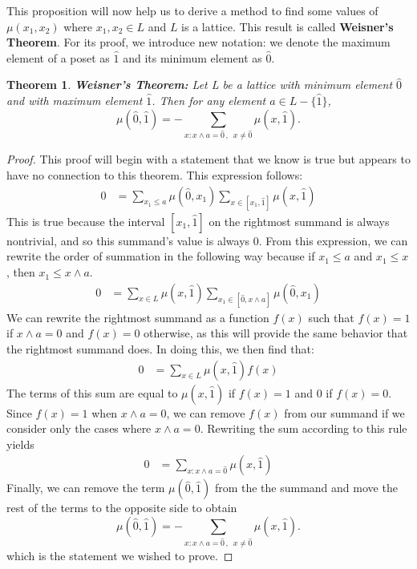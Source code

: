 \documentclass{article} %
\theoremstyle{definition}
\theoremstyle{plain}
\newtheorem{thm}{Theorem}[section]
\begin{document}
This proposition will now help us to derive a method to find some values of $\mu(x_{1}, x_{2})$ where $x_{1}, x_{2} \in L$ and $L$ is a lattice.  This result is called \textbf{Weisner's Theorem}. For its proof, we introduce new notation: we denote the maximum element of a poset as $\hat{1}$ and its minimum element as $\hat{0}$. \\

\begin{thm} \textbf{Weisner's Theorem:}
Let L be a lattice with minimum element $\hat{0}$ and with maximum element $\hat{1}$. Then for any element $a \in L-\{\hat{1}\}$,
\begin{equation*}
\mu(\hat{0}, \hat{1})=-\sum_{x:x \wedge a = \hat{0}\, , \,\,\, x \neq \hat{0}} \mu(x, \hat{1}). %
\end{equation*}
\end{thm}
\begin{proof}
This proof will begin with a statement that we know is true but appears to have no connection to this theorem. This expression follows:
\begin{align*}
0 &=  \sum_{x_{1} \leq a} \mu(\hat{0}, x_{1}) \sum_{x \in [x_{1}, \hat{1}]} \mu(x, \hat{1})
\end{align*}
This is true because the interval $[x_{1}, \hat{1}]$ on the rightmost summand is always nontrivial, and so this summand's value is always $0$. From this expression, we can rewrite the order of summation in the following way because if $x_{1} \leq a$ and $x_{1} \leq x$, then $x_{1} \leq x \wedge a$.
\begin{align*}
0 &= \sum_{x \in L} \mu(x, \hat{1}) \sum_{x_{1} \in [\hat{0}, x \wedge a]} \mu(\hat{0}, x_{1})
\end{align*}
We can rewrite the rightmost summand as a function $f(x)$ such that $f(x)=1$ if $x \wedge a = 0$ and $f(x)=0$ otherwise, as this will provide the same behavior that the rightmost summand does. In doing this, we then find that:
\begin{align}
0 &= \sum_{x \in L} \mu(x, \hat{1})f(x)
\end{align}
The terms of this sum are equal to $\mu(x, \hat{1})$ if $f(x)=1$ and $0$ if $f(x)=0$. Since $f(x)=1$ when $x \wedge a = 0$, we can remove $f(x)$ from our summand if we consider only the cases where $x \wedge a  = 0$. Rewriting the sum according to this rule yields
\begin{align*}
0 &= \sum_{x:x \wedge a=\hat{0}} \mu(x, \hat{1})
\end{align*}
Finally, we can remove the term $\mu(\hat{0}, \hat{1})$ from the the summand and move the rest of the terms to the opposite side to obtain
\begin{equation*}
\mu(\hat{0}, \hat{1})=-\sum_{x:x \wedge a = \hat{0}\, , \,\,\, x \neq \hat{0}} \mu(x, \hat{1}). %
\end{equation*}
which is the statement we wished to prove.
\end{proof}
\end{document}
